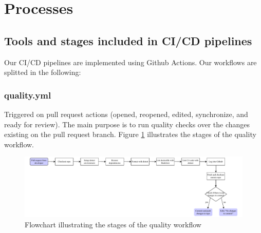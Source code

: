 \section{Processes}


\subsection{Tools and stages included in CI/CD pipelines}
\label{tools-and-stages-ci-cd}
Our CI/CD pipelines are implemented using Github Actions. Our workflows are splitted in the following:

\subsubsection{quality.yml}
Triggered on pull request actions (opened, reopened, edited, synchronize, and ready for review). The main purpose is to run quality checks over the changes existing on the pull request branch. Figure \ref{fig:quality.yml} illustrates the stages of the quality workflow.

\begin{figure}[H]
    \centering
    \includegraphics[width=\textwidth]{images/figures/Quality.pdf}
    \caption{Flowchart illustrating the stages of the quality workflow}
    \label{fig:quality.yml}
\end{figure}

